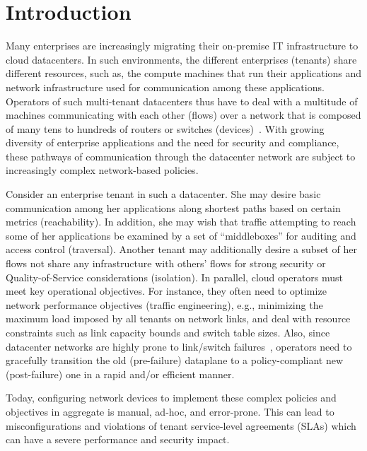 \section{Introduction}

Many enterprises are increasingly migrating their on-premise IT
infrastructure to cloud datacenters. In such environments, the
different enterprises (tenants) share different resources, such as,
the compute machines that run their applications and network
infrastructure used for communication among these applications.
Operators of such multi-tenant datacenters thus have to deal with a
multitude of machines communicating with each other (flows) over a
network that is composed of many tens to hundreds of routers or
switches (devices)~\cite{mpa-imc15}. With growing diversity of
enterprise applications and the need for security and compliance,
these pathways of communication through the datacenter network are
subject to increasingly complex network-based policies.

Consider an enterprise tenant in such a datacenter. She may desire
basic communication among her applications along shortest paths based
on certain metrics (reachability). In addition, she may wish that
traffic attempting to reach some of her applications be examined by a
set of ``middleboxes'' for auditing and access control
(traversal). Another tenant may additionally desire a subset of her
flows not share any infrastructure with others' flows for strong
security or Quality-of-Service considerations (isolation).  In
parallel, cloud operators must meet key operational objectives. For
instance, they often need to optimize network performance objectives
(traffic engineering), e.g., minimizing the maximum load imposed by
all tenants on network links, and deal with resource constraints such
as link capacity bounds and switch table sizes. Also, since datacenter
networks are highly prone to link/switch
failures~\cite{datacenterfailures}, operators need to gracefully
transition the old (pre-failure) dataplane to a policy-compliant new
(post-failure) one in a rapid and/or efficient manner.

Today, configuring network devices to implement these complex policies
and objectives in aggregate is manual, ad-hoc, and error-prone.  This
can lead to misconfigurations and violations of tenant service-level
agreements (SLAs) which can have a severe performance and security
impact.

